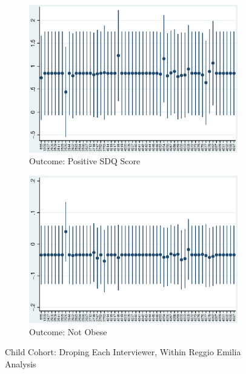     \begin{figure}[H]
      \centering
        \begin{subfigure}[t]{0.75\textwidth}
          \includegraphics[width=\textwidth]{../../../output/image/coef-interviewer-child-pos_childSDQ_score.eps}       
\caption{Outcome: Positive SDQ Score}        
        \end{subfigure}
        \begin{subfigure}[t]{0.75\textwidth}
          \includegraphics[width=\textwidth]{../../../output/image/coef-interviewer-child-BMI_obese.eps}       
 \caption{Outcome: Not Obese}        
        \end{subfigure}
      \caption{Child Cohort: Droping Each Interviewer, Within Reggio Emilia Analysis}  \label{fig:child-sensitivity-interviewer}
    \end{figure}

